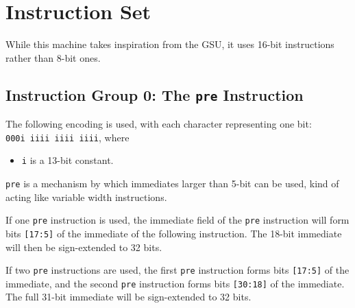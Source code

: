 \documentclass{article}
\begin{document}
	\newpage
	\section{Instruction Set}
	While this machine takes inspiration from the GSU, it uses 16-bit
	instructions rather than 8-bit ones.

	\subsection{Instruction Group 0:  The \texttt{pre} Instruction}
	The following encoding is used, with each character representing one
	bit:  \\
	\texttt{000i iiii iiii iiii}, where 
	
	\singlespacing
	\begin{itemize}
		\item \texttt{i} is a 13-bit constant.
	\end{itemize}


	\texttt{pre} is a mechanism by which immediates larger than 5-bit can
	be used, kind of acting like variable width instructions.
	
	If one \texttt{pre} instruction is used, the immediate field of the
	\texttt{pre} instruction will form bits \texttt{[17:5]} of the
	immediate of the following instruction.  The 18-bit immediate will then
	be sign-extended to 32 bits.

	If two \texttt{pre} instructions are used, the first \texttt{pre}
	instruction forms bits \texttt{[17:5]} of the immediate, and the second
	\texttt{pre} instruction forms bits \texttt{[30:18]} of the immediate.
	The full 31-bit immediate will be sign-extended to 32 bits.
\end{document}
